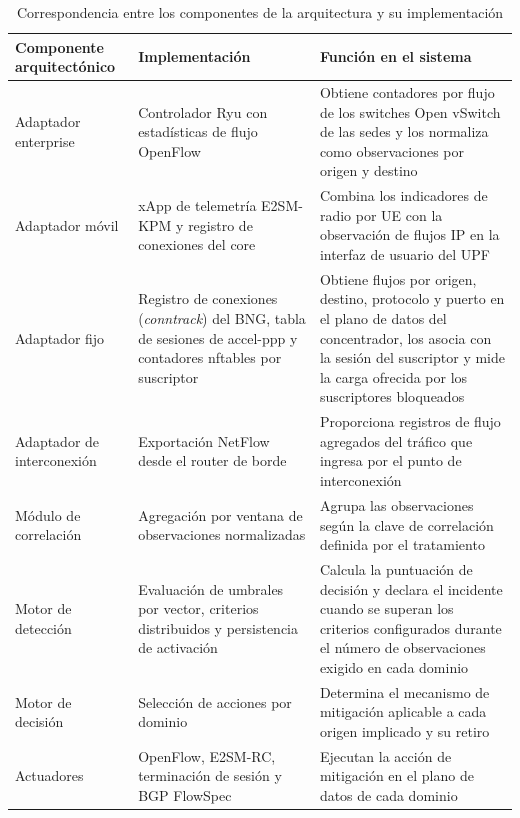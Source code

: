 \begin{table}[H]
    \begin{center}
        \renewcommand{\arraystretch}{1.5}
        \fontsize{10}{12}\selectfont
        \begin{tabular}{ >{\arraybackslash}m{3.5cm} >{\arraybackslash}m{4.5cm} >{\arraybackslash}m{6cm} }
        \hline
        \textbf{Componente arquitectónico} & \textbf{Implementación} & \textbf{Función en el sistema} \\ \hline
        Adaptador enterprise & Controlador Ryu con estadísticas de flujo OpenFlow & Obtiene contadores por flujo de los switches Open vSwitch de las sedes y los normaliza como observaciones por origen y destino \\ \hline
        Adaptador móvil & xApp de telemetría E2SM-KPM y registro de conexiones del core & Combina los indicadores de radio por UE con la observación de flujos IP en la interfaz de usuario del UPF \\ \hline
        Adaptador fijo & Registro de conexiones (\textit{conntrack}) del BNG, tabla de sesiones de accel-ppp y contadores nftables por suscriptor & Obtiene flujos por origen, destino, protocolo y puerto en el plano de datos del concentrador, los asocia con la sesión del suscriptor y mide la carga ofrecida por los suscriptores bloqueados \\ \hline
        Adaptador de interconexión & Exportación NetFlow desde el router de borde & Proporciona registros de flujo agregados del tráfico que ingresa por el punto de interconexión \\ \hline
        Módulo de correlación & Agregación por ventana de observaciones normalizadas & Agrupa las observaciones según la clave de correlación definida por el tratamiento \\ \hline
        Motor de detección & Evaluación de umbrales por vector, criterios distribuidos y persistencia de activación & Calcula la puntuación de decisión y declara el incidente cuando se superan los criterios configurados durante el número de observaciones exigido en cada dominio \\ \hline
        Motor de decisión & Selección de acciones por dominio & Determina el mecanismo de mitigación aplicable a cada origen implicado y su retiro \\ \hline
        Actuadores & OpenFlow, E2SM-RC, terminación de sesión y BGP FlowSpec & Ejecutan la acción de mitigación en el plano de datos de cada dominio \\ \hline
        \end{tabular}
        \caption{Correspondencia entre los componentes de la arquitectura y su implementación}
        \label{tab:arq_implementacion}
    \end{center}
\end{table}

